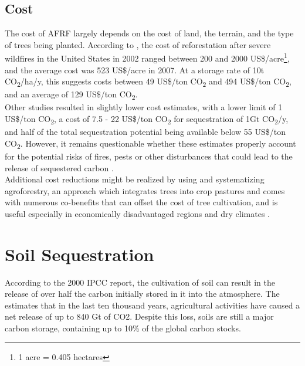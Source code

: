 \subsection*{Cost}
The cost of AFRF largely depends on the cost of land, the terrain, and the type of trees being planted. According to \textcite{Gorte2009U.S.Sequestration}, the cost of reforestation after severe wildfires in the United States in 2002 ranged between 200 and 2000 US\$/acre\footnote{1 acre = 0.405 hectares}, and the average cost was 523 US\$/acre in 2007. At a storage rate of 10t CO\textsubscript{2}/ha/y, this suggests costs between 49 US\$/ton CO\textsubscript{2}  and  494 US\$/ton CO\textsubscript{2}, and an average of 129 US\$/ton CO\textsubscript{2}.\\Other studies resulted in slightly lower cost estimates, with a lower limit of 1 US\$/ton CO\textsubscript{2}, a cost of 7.5 - 22 US\$/ton CO\textsubscript{2} for sequestration of 1Gt CO\textsubscript{2}/y, and half of the total sequestration potential being available below 55 US\$/ton CO\textsubscript{2}. However, it remains questionable whether these estimates properly account for the potential risks of fires, pests or other disturbances that could lead to the release of sequestered carbon \parencite[41-42]{NationalResearchCouncil2015ClimateSequestration}.\\Additional cost reductions might be realized by using and systematizing agroforestry, an approach which integrates trees into crop pastures and comes with numerous co-benefits that can offset the cost of tree cultivation, and is useful especially in economically disadvantaged regions and dry climates \parencite{Reij2014ImprovingAchievable}.

\section{Soil Sequestration}
According to the 2000 IPCC report, the cultivation of soil can result in the release of over half the carbon initially stored in it into the atmosphere. The \textcite{NationalResearchCouncil2015ClimateSequestration} estimates that in the last ten thousand years, agricultural activities have caused a net release of up to 840 Gt of CO2. Despite this loss, soils are still a major carbon storage, containing up to 10\% of the global carbon stocks.
